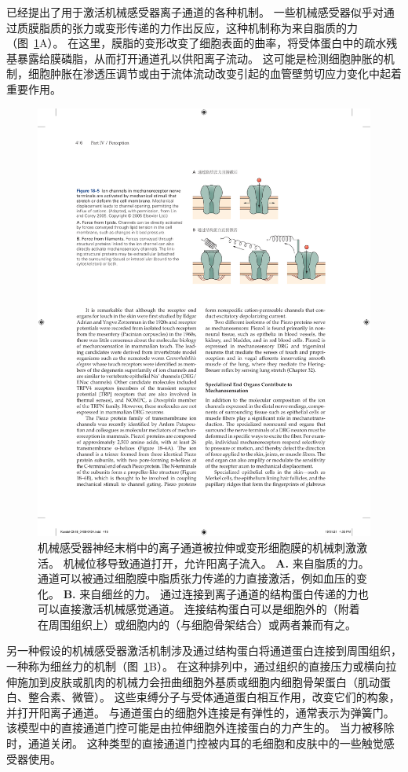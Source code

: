 已经提出了用于激活机械感受器离子通道的各种机制。
一些机械感受器似乎对通过质膜脂质的张力或变形传递的力作出反应，这种机制称为来自脂质的力（图~\ref{fig:18_5}A）。
在这里，膜脂的变形改变了细胞表面的曲率，将受体蛋白中的疏水残基暴露给膜磷脂，从而打开通道孔以供阳离子流动。
这可能是检测细胞肿胀的机制，细胞肿胀在渗透压调节或由于流体流动改变引起的血管壁剪切应力变化中起着重要作用。


\begin{figure}[htbp]
	\centering
	\includegraphics[width=0.7\linewidth]{chap18/fig_18_5}
	\caption{机械感受器神经末梢中的离子通道被拉伸或变形细胞膜的机械刺激激活。
		机械位移导致通道打开，允许阳离子流入\cite{lin2005trp}。
		\textbf{A.} 来自脂质的力。
		通道可以被通过细胞膜中脂质张力传递的力直接激活，例如血压的变化。
		\textbf{B.} 来自细丝的力。
		通过连接到离子通道的结构蛋白传递的力也可以直接激活机械感觉通道。
		连接结构蛋白可以是细胞外的（附着在周围组织上）或细胞内的（与细胞骨架结合）或两者兼而有之。}
	\label{fig:18_5}
\end{figure}


另一种假设的机械感受器激活机制涉及通过结构蛋白将通道蛋白连接到周围组织，一种称为细丝力的机制（图~\ref{fig:18_5}B）。
在这种排列中，通过组织的直接压力或横向拉伸施加到皮肤或肌肉的机械力会扭曲细胞外基质或细胞内细胞骨架蛋白（肌动蛋白、整合素、微管）。
这些束缚分子与受体通道蛋白相互作用，改变它们的构象，并打开阳离子通道。
与通道蛋白的细胞外连接是有弹性的，通常表示为弹簧门。
该模型中的直接通道门控可能是由拉伸细胞外连接蛋白的力产生的。
当力被移除时，通道关闭。
这种类型的直接通道门控被内耳的毛细胞和皮肤中的一些触觉感受器使用。


